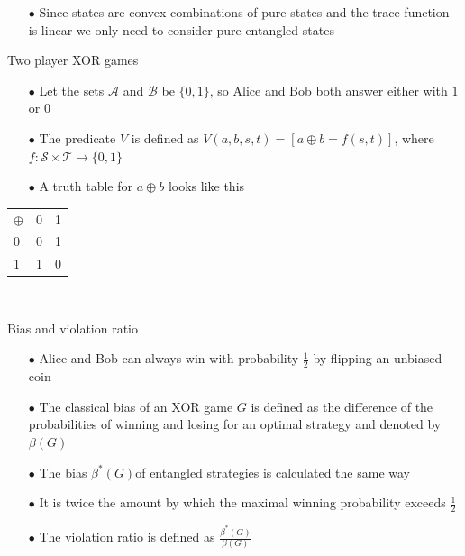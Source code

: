 \begin{frame}{}
\begin{itemize}
    \item[$\bullet$] Since states are convex combinations of pure states and the trace function is linear we only need to consider pure entangled states
    
\end{itemize}
\end{frame}

\begin{frame}{Two player XOR games}
\begin{itemize}
    \item[$\bullet$] Let the sets $\mathcal{A}$ and $\mathcal{B}$ be $\{0,1\}$, so Alice and Bob both answer either with $1$ or $0$
    \item[$\bullet$] The predicate $V$ is defined as $V(a,b,s,t) = [ a\oplus b = f(s,t)]$, where $f: \mathcal{S} \times \mathcal{T} \rightarrow \{0,1\}$
    \item[$\bullet$] A truth table for $a \oplus b$ looks like this
\end{itemize}
    \begin{center}
\begin{tabular}{l | c r }
$\oplus$ & 0 & 1 \\
\cline{1-3} 

0 & 0 & 1 \\
1 & 1 & 0 
\end{tabular}\\
\end{center}
\end{frame}

\begin{frame}{Bias and violation ratio}
\begin{itemize}
    \item[$\bullet$] Alice and Bob can always win with probability $\frac{1}{2}$ by flipping an unbiased coin
    \item[$\bullet$] The classical bias of an XOR game $G$ is defined as the difference of the probabilities of winning and losing for an optimal strategy and denoted by $\beta(G)$
    \item[$\bullet$] The bias $\beta^*(G)$of entangled strategies is calculated the same way 
    \item[$\bullet$] It is twice the amount by which the maximal winning probability exceeds $\frac{1}{2}$
    \item[$\bullet$] The violation ratio is defined as $\frac{\beta^*(G)}{\beta(G)}$
\end{itemize}
    
\end{frame}


